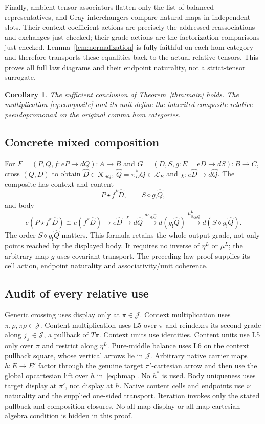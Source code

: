 \documentclass[11pt,a4paper]{article}
\newtheorem{corollary}[theorem]{Corollary}
\theoremstyle{definition}
\newcommand{\Lcat}{\mathcal L}
\newcommand{\K}{\mathcal K}
\newcommand{\J}{\mathcal J}
\newcommand{\starc}{\mathbin{\star}}
\newcommand{\diamondc}{\mathbin{\diamond}}
\begin{document}
Finally, ambient tensor associators flatten only the list of balanced
representatives, and Gray interchangers compare natural maps in independent
slots. Their context coefficient actions are precisely the addressed
reassociations and exchanges just checked; their grade actions are the
factorization comparisons just checked. Lemma~\ref{lem:normalization} is fully
faithful on each hom category and therefore transports these equalities back
to the actual relative tensors. This proves all full law diagrams and their
endpoint naturality, not a strict-tensor surrogate.

\begin{corollary}\label{cor:law}
The sufficient conclusion of Theorem~\ref{thm:main} holds. The multiplication
\eqref{eq:composite} and its unit define the inherited composite relative
pseudopromonad on the original comma hom categories.
\end{corollary}

\subsection{Concrete mixed composition}
For $F=(P,Q,f:eP\to dQ):A\to B$ and
$G=(D,S,g:E=eD\to dS):B\to C$, cross $(Q,D)$ to obtain
$\widehat D\in\K_{dQ}$, $\widehat Q=\pi_D^*Q\in\Lcat_E$ and
$\chi:e\widehat D\to d\widehat Q$. The composite has context and content
\[
 P\starc f^*\widehat D,\qquad S\diamondc g_!\widehat Q,
\]
and body
\[
 e(P\starc f^*\widehat D)\cong e(f^*\widehat D)
 \longrightarrow e\widehat D\xrightarrow{\chi}d\widehat Q
 \xrightarrow{d\kappa_{g,\widehat Q}}d(g_!\widehat Q)
 \xrightarrow{\mu^L_{S,g_!\widehat Q}}d(S\diamondc g_!\widehat Q).
\]
The order $S\diamondc g_!\widehat Q$ matters. This formula retains the whole
output grade, not only points reached by the displayed body. It requires no
inverse of $\eta^L$ or $\mu^L$; the arbitrary map $g$ uses covariant transport.
The preceding law proof supplies its cell action, endpoint naturality and
associativity/unit coherence.

\subsection{Audit of every relative use}
Generic crossing uses display only at $\pi\in\J$. Context multiplication uses
$\pi,\rho,\pi\rho\in\J$. Content multiplication uses L5 over $\pi$ and
reindexes its second grade along $j_\pi\in\J$, a pullback of $T\pi$.
Context units use identities. Content units use L5 only over $\pi$ and restrict
along $\eta^L$. Pure-middle balance uses L6 on the context pullback square,
whose vertical arrows lie in $\J$. Arbitrary native carrier maps
$h:E\to E'$ factor through the genuine target $\pi'$-cartesian arrow and
then use the global opcartesian lift over $h$ in~\eqref{eq:hmap}. No $h^*$
is used. Body uniqueness uses target display at $\pi'$, not display at $h$. Native content cells and endpoints use $\nu$ naturality and
the supplied one-sided transport. Iteration invokes only the stated pullback
and composition closures. No all-map display or all-map cartesian-algebra
condition is hidden in this proof.
\end{document}
